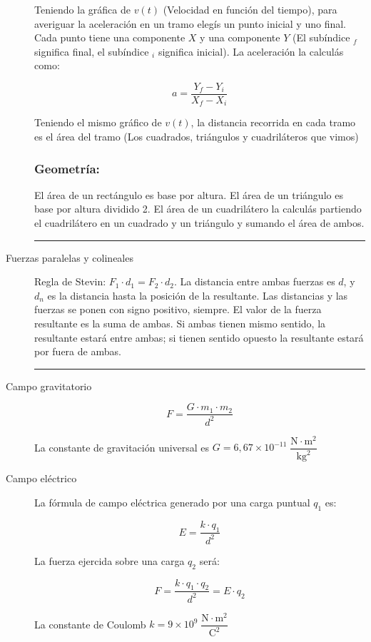 \begin{description}
    Teniendo la gráfica de $v(t)$ (Velocidad en función del tiempo), para averiguar la aceleración en un tramo elegís un punto inicial y uno final. Cada punto tiene una componente $X$ y una componente $Y$ (El subíndice $_f$ significa final, el subíndice $_i$ significa inicial). La aceleración la calculás como:
    
    \[a=\dfrac{Y_f - Y_i}{X_f - X_i}\]
    
    Teniendo el mismo gráfico de $v(t)$, la distancia recorrida en cada tramo es el área del tramo (Los cuadrados, triángulos y cuadriláteros que vimos)
    
    \subsubsection*{Geometría:}
    
    El área de un rectángulo es base por altura. El área de un triángulo es base por altura dividido 2. El área de un cuadrilátero la calculás partiendo el cuadrilátero en un cuadrado y un triángulo y sumando el área de ambos.
    \vspace{0.5cm}

    \hrule

    \item[Fuerzas paralelas y colineales]\hfil

    Regla de Stevin: $F_1 \cdot d_1 = F_2 \cdot d_2$. La distancia entre ambas fuerzas es $d$, y $d_n$ es la distancia hasta la posición de la resultante. Las distancias y las fuerzas se ponen con signo positivo, siempre. El valor de la fuerza resultante es la suma de ambas. Si ambas tienen mismo sentido, la resultante estará entre ambas; si tienen sentido opuesto la resultante estará por fuera de ambas.

\skipline
\hrule
\skipline

\item[Campo gravitatorio]\hfil
$$F = \dfrac{G\cdot m_1 \cdot m_2}{d^2}$$

La constante de gravitación universal es $G = 6,67\times 10^{-11}\;\dfrac{\text{N}\cdot \text{m}^2}{\text{kg}^2}$

\item[Campo eléctrico]\hfil

La fórmula de campo eléctrica generado por una carga puntual $q_1$ es:

$$E = \dfrac{k \cdot q_1}{d^2}$$

La fuerza ejercida sobre una carga $q_2$ será:

$$F = \dfrac{k\cdot q_1 \cdot q_2}{d^2} = E \cdot q_2$$ 

La constante de Coulomb $k = 9\times 10^{9}\;\dfrac{\text{N}\cdot \text{m}^2}{\text{C}^2}$

\end{description}

